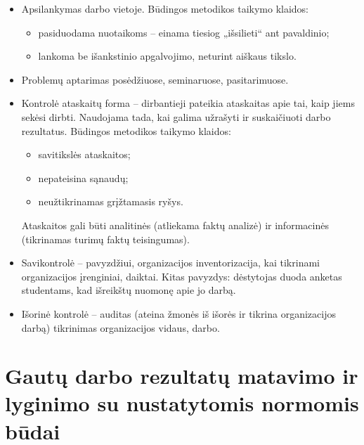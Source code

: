 \begin{itemize}
  \item Apsilankymas darbo vietoje. Būdingos metodikos taikymo
    klaidos:
    \begin{itemize}
      \item pasiduodama nuotaikoms – einama tiesiog „išsilieti“ ant
        pavaldinio;
      \item lankoma be išankstinio apgalvojimo, neturint aiškaus
        tikslo.
    \end{itemize}
  \item Problemų aptarimas posėdžiuose, seminaruose, pasitarimuose.
  \item Kontrolė ataskaitų forma – dirbantieji pateikia ataskaitas
    apie tai, kaip jiems sekėsi dirbti. Naudojama tada, kai galima
    užrašyti ir suskaičiuoti darbo rezultatus. Būdingos metodikos
    taikymo klaidos:
    \begin{itemize}
      \item savitikslės ataskaitos;
      \item nepateisina sąnaudų;
      \item neužtikrinamas grįžtamasis ryšys.
    \end{itemize}
    Ataskaitos gali būti analitinės (atliekama faktų analizė) ir
    informacinės (tikrinamas turimų faktų teisingumas).
  \item Savikontrolė – pavyzdžiui, organizacijos inventorizacija, kai
    tikrinami organizacijos įrenginiai, daiktai. Kitas pavyzdys:
    dėstytojas duoda anketas studentams, kad išreikštų nuomonę apie
    jo darbą.
  \item Išorinė kontrolė – auditas (ateina žmonės iš išorės ir tikrina
    organizacijos darbą) tikrinimas organizacijos vidaus, darbo.
\end{itemize}

\section{Gautų darbo rezultatų matavimo ir lyginimo su nustatytomis
normomis būdai}

